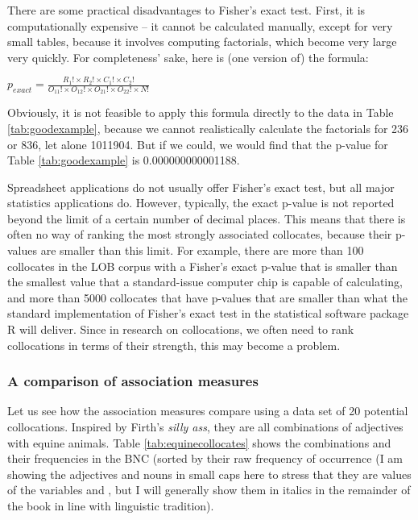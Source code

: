 There are some practical disadvantages to Fisher's exact test. First, it is computationally expensive -- it cannot be calculated manually, except for very small tables, because it involves computing factorials, which become very large very quickly. For completeness' sake, here is (one version of) the formula:

\begin{exe}
\ex $\displaystyle{p_{exact} = \frac{R_1! \times R_2! \times C_1! \times C_2!}{O_{11}! \times O_{12}! \times O_{21}! \times  O_{22}! \times N!}}$ 
\label{ex:fisherexaxt}
\end{exe}

Obviously, it is not feasible to apply this formula directly to the data in Table \ref{tab:goodexample}, because we cannot realistically calculate the factorials for 236 or 836, let alone \num{1011904}. But if we could, we would find that the p-value for Table \ref{tab:goodexample} is 0.000000000001188.

Spreadsheet applications do not usually offer Fisher's exact test, but all major statistics applications do. However, typically, the exact p-value is not reported beyond the limit of a certain number of decimal places. This means that there is often no way of ranking the most strongly associated collocates, because their p-values are smaller than this limit. For example, there are more than 100 collocates in the LOB corpus with a Fisher's exact p-value that is smaller than the smallest value that a standard-issue computer chip is capable of calculating, and more than 5000 collocates that have p-values that are smaller than what the standard implementation of Fisher's exact test in the statistical software package R will deliver. Since in research on collocations, we often need to rank collocations in terms of their strength, this may become a problem.

\subsubsection{A comparison of association measures}
\label{sec:amcomparison}

Let us see how the association measures compare using a data set of 20 potential collocations. Inspired by Firth's \textit{silly ass}, they are all combinations of adjectives with equine animals. Table \ref{tab:equinecollocates} shows the combinations and their frequencies in the BNC (sorted by their raw frequency of occurrence (I am showing the adjectives and nouns in small caps here to stress that they are values of the variables  and , but I will generally show them in italics in the remainder of the book in line with linguistic tradition).

